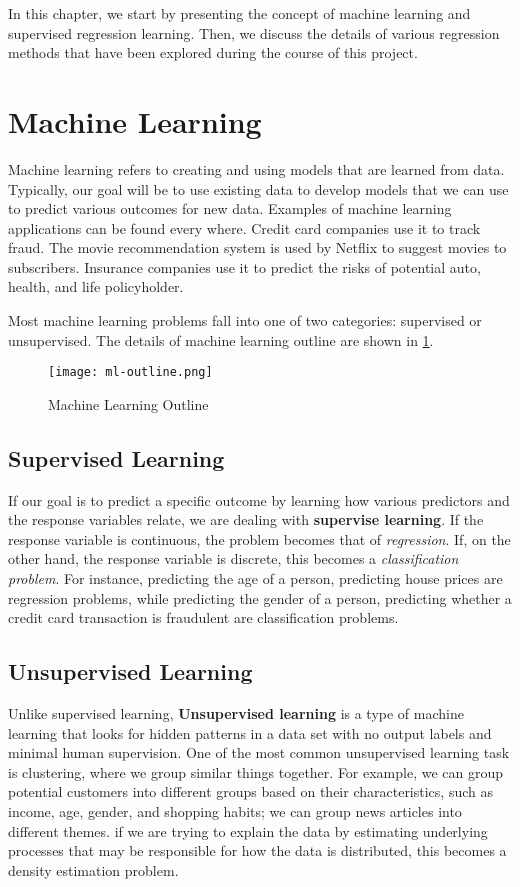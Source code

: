 
In this chapter, we start by presenting the concept of machine learning and
supervised regression learning. Then, we discuss the details of various
regression methods that have been explored during the course of this project.

\section{Machine Learning}

Machine learning refers to creating and using models that are learned from data.
Typically, our goal will be to use existing data to develop models that we can
use to predict various outcomes for new data. Examples of machine learning
applications can be found every where. Credit card companies use it to track
fraud.  The movie recommendation system is used by Netflix to suggest movies to
subscribers. Insurance companies use it to predict the risks of potential auto,
health, and life policyholder.

Most machine learning problems fall into one of two categories: supervised or
unsupervised. The details of machine learning outline are shown in
\ref{fig:ml-outline}.

\begin{figure}[H]\centering
    \texttt{[image: ml-outline.png]}
    \caption{Machine Learning Outline}
    \label{fig:ml-outline}
\end{figure}

\subsection{Supervised Learning}

If our goal is to predict a specific outcome by learning how various predictors
and the response variables relate, we are dealing with \textbf{supervise
learning}. If the response variable is continuous, the problem becomes that of
\textit{regression}. If, on the other hand, the response variable is discrete,
this becomes a \textit{classification problem}. For instance, predicting the age
of a person, predicting house prices are regression problems, while predicting
the gender of a person, predicting whether a credit card transaction is
fraudulent are classification problems.

\subsection{Unsupervised Learning}
Unlike supervised learning, \textbf{Unsupervised learning} is a type of machine
learning that looks for hidden patterns in a data set with no output labels and
minimal human supervision. One of the most common unsupervised learning task is
clustering, where we group similar things together. For example, we can group
potential customers into different groups based on their characteristics, such
as income, age, gender, and shopping habits; we can group news articles into
different themes. if we are trying to explain the data by estimating underlying
processes that may be responsible for how the data is distributed, this becomes
a density estimation problem.

